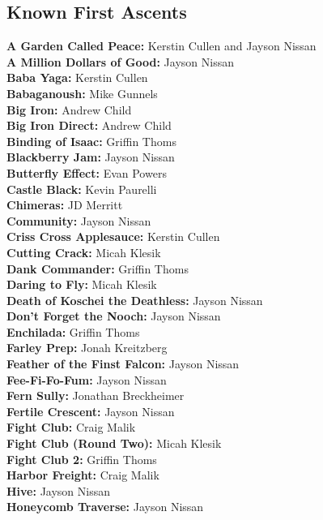 \begin{flushleft}
\section{Known First Ascents}
\textbf{A Garden Called Peace:} Kerstin Cullen and Jayson Nissan\\
\textbf{A Million Dollars of Good:} Jayson Nissan\\
\textbf{Baba Yaga:} Kerstin Cullen\\
\textbf{Babaganoush:} Mike Gunnels\\
\textbf{Big Iron:} Andrew Child\\
\textbf{Big Iron Direct:} Andrew Child\\
\textbf{Binding of Isaac:} Griffin Thoms\\
\textbf{Blackberry Jam:} Jayson Nissan\\
\textbf{Butterfly Effect:} Evan Powers\\
\textbf{Castle Black:} Kevin Paurelli\\
\textbf{Chimeras:} JD Merritt\\
\textbf{Community:} Jayson Nissan\\
\textbf{Criss Cross Applesauce:} Kerstin Cullen\\
\textbf{Cutting Crack:} Micah Klesik\\
\textbf{Dank Commander:} Griffin Thoms\\
\textbf{Daring to Fly:} Micah Klesik\\
\textbf{Death of Koschei the Deathless:} Jayson Nissan\\
\textbf{Don't Forget the Nooch:} Jayson Nissan\\
\textbf{Enchilada:} Griffin Thoms\\
\textbf{Farley Prep:} Jonah Kreitzberg\\
\textbf{Feather of the Finst Falcon:} Jayson Nissan\\
\textbf{Fee-Fi-Fo-Fum:} Jayson Nissan\\
\textbf{Fern Sully:} Jonathan Breckheimer\\
\textbf{Fertile Crescent:} Jayson Nissan\\
\textbf{Fight Club:} Craig Malik\\
\textbf{Fight Club (Round Two):} Micah Klesik\\
\textbf{Fight Club 2:} Griffin Thoms\\
\textbf{Harbor Freight:} Craig Malik\\
\textbf{Hive:} Jayson Nissan\\
\textbf{Honeycomb Traverse:} Jayson Nissan\\

\end{flushleft}
